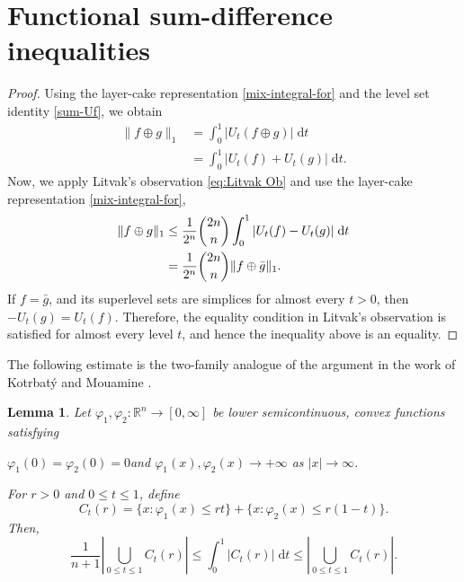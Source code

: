 \documentclass[11pt]{amsart}
\newcommand{\R}{{\mathbb R}}
\theoremstyle{plain}
\newtheorem{lemma}[theorem]{Lemma}
\theoremstyle{definition}
\theoremstyle{remark}
\begin{document}
\section{Functional sum-difference inequalities}
\label{sec:sumdiff}




\LitvakFuncQuasi*


\begin{proof}
    Using the layer-cake representation \eqref{mix-integral-for} and the level set identity \eqref{sum-Uf}, we obtain
    \begin{align*}
        \| f \oplus g\|_1 &=\int_0^1|U_t(f \oplus {g})| \;\mathrm dt
        \\
        &=
        \int_0^1|U_t(f)+ U_t({g})| \;\mathrm dt .
    \end{align*}
    Now, we apply Litvak's observation \eqref{eq:Litvak Ob} and use the layer-cake representation \eqref{mix-integral-for},
    \begin{align*}
        \| f \oplus g\|_1
        &\leq
        \frac{1}{2^n}\binom{2 n}{n} \int_0^1|U_t(f) -  U_t({g})| \;\mathrm dt
        \\
        &=\frac{1}{2^n}\binom{2 n}{n} \| f \oplus \Bar{g}\|_1.
    \end{align*}
    If $f = \bar g$, and its superlevel sets are simplices for almost every $t>0$, then $ -U_t ( g) = U_t (f).$ Therefore, the equality condition in Litvak's observation is satisfied for almost every level $t$, and hence the inequality above is an equality.
\end{proof}

The following estimate is the two-family analogue of the argument in the work of Kotrbat\'y and Mouamine \cite{KM-26}.

\begin{lemma} \label{lem:KM-lp}
    Let $\varphi_1,\varphi_2 : \R^n \to [0,\infty]$  be lower semicontinuous, convex functions satisfying
    \begin{center}
        $\varphi_1(0) = \varphi_2(0) = 0$\quad and \quad$\varphi_1(x), \varphi_2 (x) \to + \infty$ as $|x| \to \infty$.
    \end{center}
    For $r >0$ and $0 \leq t\leq 1$, define
    \[
        C_t(r) = \{x: \varphi_1(x) \leq rt\} + \{x: \varphi_2(x) \leq r(1-t)\}.
    \]
    Then,
    \[
        \frac{1}{n+1} \left|\bigcup_{0 \leq t \leq 1} C_t(r) \right|
        \leq
        \int_0^1\left|C_t(r)\right| \;\mathrm d t
        \leq
        \left|\bigcup_{0 \leq t \leq 1} C_t(r)\right|.
    \]
\end{lemma}
\end{document}
